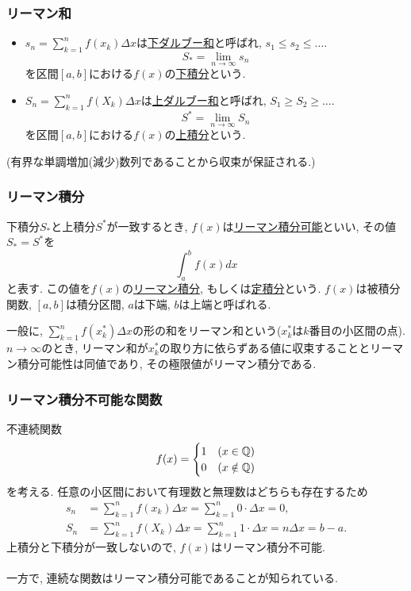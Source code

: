 \begin{frame}
\frametitle{リーマン和}

\begin{itemize}
\item $s_n=\sum_{k=1}^nf(x_k)\Delta x$は\underline{下ダルブー和}と呼ばれ, $s_1 \le s_2 \le \dots$. 
$$S_*=\lim_{n \to \infty} s_n$$
を区間$[a,b]$における$f(x)$の\underline{下積分}という. 
\item $S_n=\sum_{k=1}^nf(X_k)\Delta x$は\underline{上ダルブー和}と呼ばれ, $S_1 \ge S_2 \ge \dots$. 
$$S^*=\lim_{n \to \infty} S_n$$
を区間$[a,b]$における$f(x)$の\underline{上積分}という. 
\end{itemize}
(有界な単調増加(減少)数列であることから収束が保証される.)

\end{frame}





\begin{frame}
\frametitle{リーマン積分}


\begin{Def}
下積分$S_*$と上積分$S^*$が一致するとき, $f(x)$は\underline{リーマン積分可能}といい, その値$S_*=S^*$を
$$
\int_a^b f(x)dx
$$
と表す. この値を$f(x)$の\underline{リーマン積分}, もしくは\underline{定積分}という. 
$f(x)$は被積分関数, $[a,b]$は積分区間, $a$は下端, $b$は上端と呼ばれる. 
\end{Def}

一般に, $\sum_{k=1}^nf(x_k^*)\Delta x$の形の和をリーマン和という($x_k^*$は$k$番目の小区間の点). 
$n \to \infty$のとき, リーマン和が$x_k^*$の取り方に依らずある値に収束することとリーマン積分可能性は同値であり, 
その極限値がリーマン積分である.  

\end{frame}




\begin{frame}
\frametitle{リーマン積分不可能な関数}

不連続関数
$$
f(x)=
\begin{cases}
1 & (x \in \mathbb{Q})\\
0 & (x \notin \mathbb{Q})
\end{cases}
$$
を考える. 
任意の小区間において有理数と無理数はどちらも存在するため
\begin{align*}
s_n &= \sum_{k=1}^nf(x_k)\Delta x = \sum_{k=1}^n 0 \cdot \Delta x =0, \\
S_n &= \sum_{k=1}^nf(X_k)\Delta x = \sum_{k=1}^n 1 \cdot \Delta x =n \Delta x = b-a. 
\end{align*}
上積分と下積分が一致しないので, $f(x)$はリーマン積分不可能. \\
\ \\

一方で, 連続な関数はリーマン積分可能であることが知られている. 
\end{frame}



